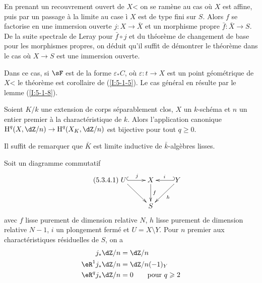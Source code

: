 En prenant un recouvrement ouvert de $X$< on se ramène au cas où $X$ est 
affine, puis par un passage à la limite au case \`i $X$ est de type fini sur 
$S$. Alors $f$ se factorise en une immersion ouverte $j:X\to \bar X$ et un 
morphisme propre $\bar f:\bar X\to S$. De la suite spectrale de Leray pour 
$\bar f\circ j$ et du théorème de changement de base pour les morphismes 
propres, on déduit qu'il suffit de démontrer le théorème dans le cas 
où $X\to S$ est une immersion ouverte. 

Dans ce cas, si $\sF$ est de la forme $\varepsilon_* C$, où 
$\varepsilon:t\to X$ est un point géométrique de $X$< le théorème est 
corollaire de (\ref{I:5-1-5}). Le cas général en résulte par le lemme 
(\ref{I:5-1-8}). 





\begin{corollary}\label{I:5-3-3}
Soient $K/k$ une extension de corps séparablement clos, $X$ un $k$-schéma 
et $n$ un entier premier à la charactéristique de $k$. Alors l'application 
canonique $\h^q(X,\dZ/n) \to \h^q(X_K,\dZ/n)$ est bijective pour tout 
$q\geqslant 0$. 
\end{corollary}

Il suffit de remarquer que $\bar K$ est limite inductive de $\bar k$-algèbres 
lisses. 





\begin{theorem}\label{I:5-3-4}
Soit un diagramme commutatif 
\begin{equation*}\tag{5.3.4.1}\label{I:eq:5-3-4-1}\xymatrix{
  U \ar@{^{(}->}[r]^-j \ar[dr]
    & X \ar[d]^-f 
    & \ar@{_{(}->}[l]_-i Y \ar[dl]^-h \\
  & S
}\end{equation*}
avec $f$ lisse purement de dimension relative $N$, $h$ lisse purement de 
dimension relative $N-1$, $i$ un plongement fermé et $U=X\setminus Y$. Pour 
$n$ premier aux charactéristiques résiduelles de $S$, on a 
\begin{equation*}
\begin{aligned}
  j_* \dZ/n     &= \dZ/n \\
  \eR^1 j_*\dZ/n &= \dZ/n(-1)_Y \\
  \eR^q j_*\dZ/n &= 0 \qquad \text{pour $q\geqslant 2$}
\end{aligned}
\end{equation*}
\end{theorem}

